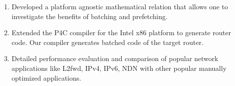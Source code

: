 \begin{enumerate}
\item Developed a platform agnostic mathematical relation that allows one to investigate the benefits of batching and prefetching.
\item Extended the P4C compiler for the Intel x86 platform to generate router code. Our compiler generates batched code of the target router.
\item Detailed performance evaluation and comparison of popular network applications like L2fwd, IPv4, IPv6, NDN with other popular manually optimized applications.
\end{enumerate}
